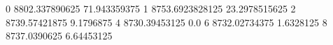 0 8802.337890625 71.943359375
1 8753.6923828125 23.2978515625
2 8739.57421875 9.1796875
4 8730.39453125 0.0
6 8732.02734375 1.6328125
8 8737.0390625 6.64453125
